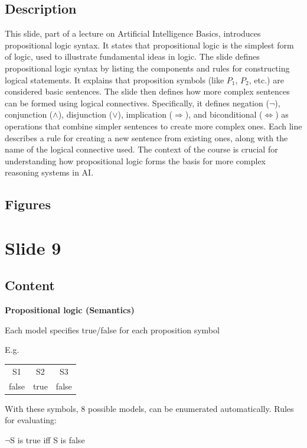 \documentclass{article}%
\begin{document}
\subsection{Description}%
This slide, part of a lecture on Artificial Intelligence Basics, introduces propositional logic syntax.  It states that propositional logic is the simplest form of logic, used to illustrate fundamental ideas in logic.  The slide defines propositional logic syntax by listing the components and rules for constructing logical statements.  It explains that proposition symbols (like $P_1$, $P_2$, etc.) are considered basic sentences.  The slide then defines how more complex sentences can be formed using logical connectives.  Specifically, it defines negation ($\neg$), conjunction ($\land$), disjunction ($\lor$), implication ($\Rightarrow$), and biconditional ($\Leftrightarrow$) as operations that combine simpler sentences to create more complex ones.  Each line describes a rule for creating a new sentence from existing ones, along with the name of the logical connective used.  The context of the course is crucial for understanding how propositional logic forms the basis for more complex reasoning systems in AI.%
\subsection{Figures}%
\begin{figure}[H]%
\centering%
\end{figure}

%
\newpage%
\section{Slide 9}%
\label{sec:Slide9}%
\subsection{Content}%

\textbf{Propositional logic (Semantics)}

Each model specifies true/false for each proposition symbol

E.g.
\begin{tabular}{ccc}
S1 & S2 & S3 \\
false & true & false
\end{tabular}

With these symbols, 8 possible models, can be enumerated automatically. Rules for evaluating:

$\neg$S is true iff S is false
\end{document}
